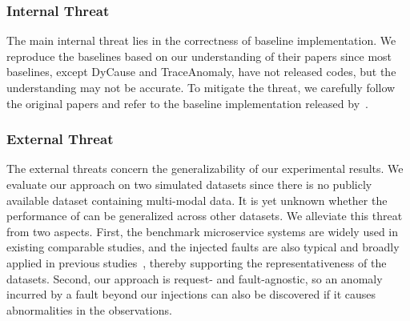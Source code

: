 \subsubsection{Internal Threat}
The main internal threat lies in the correctness of baseline implementation.
We reproduce the baselines based on our understanding of their papers since most baselines, except DyCause and TraceAnomaly, have not released codes, but the understanding may not be accurate.
To mitigate the threat, we carefully follow the original papers and refer to the baseline implementation released by~\cite{DyCause}. 

\subsubsection{External Threat}
The external threats concern the generalizability of our experimental results. We evaluate our approach on two simulated datasets since there is no publicly available dataset containing multi-modal data.
It is yet unknown whether the performance of \name can be generalized across other datasets.
We alleviate this threat from two aspects.
First, the benchmark microservice systems are widely used in existing comparable studies, and the injected faults are also typical and broadly applied in previous studies~\cite{MicroRank, AutoMAP, DyCause}, thereby supporting the representativeness of the datasets.
Second, our approach is request- and fault-agnostic, so an anomaly incurred by a fault beyond our injections can also be discovered if it causes abnormalities in the observations.
